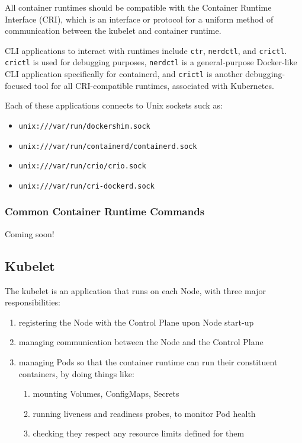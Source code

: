 \documentclass[11pt, a4paper]{article}
\begin{document}
All container runtimes should be compatible with the Container Runtime Interface (CRI), which is an interface or protocol for a uniform method of communication between the kubelet and container runtime. 

CLI applications to interact with runtimes include \texttt{ctr}, \texttt{nerdctl}, and \texttt{crictl}. \texttt{crictl} is used for debugging purposes, \texttt{nerdctl} is a general-purpose Docker-like CLI application specifically for containerd, and \texttt{crictl} is another debugging-focused tool for all CRI-compatible runtimes, associated with Kubernetes.

Each of these applications connects to Unix sockets suck as:

\begin{itemize}
\item \texttt{unix:///var/run/dockershim.sock}
\item \texttt{unix:///var/run/containerd/containerd.sock}
\item \texttt{unix:///var/run/crio/crio.sock}
\item \texttt{unix:///var/run/cri-dockerd.sock}
\end{itemize}

\subsubsection{Common Container Runtime Commands}

Coming soon!

\subsection{Kubelet}

The kubelet is an application that runs on each Node, with three major responsibilities:

\begin{enumerate}
\item registering the Node with the Control Plane upon Node start-up
\item managing communication between the Node and the Control Plane
\item managing Pods so that the container runtime can run their constituent containers, by doing things like:
	\begin{enumerate}
	\item mounting Volumes, ConfigMaps, Secrets
	\item running liveness and readiness probes, to monitor Pod health
	\item checking they respect any resource limits defined for them
	\end{enumerate}
\end{enumerate}
\end{document}
